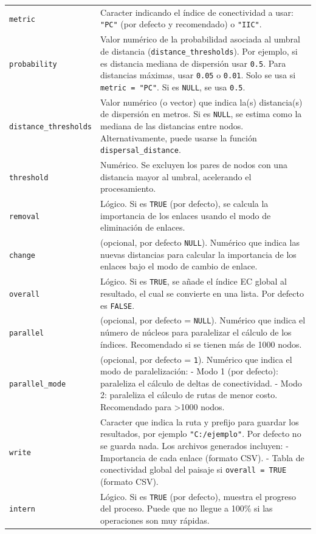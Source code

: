 \documentclass[
]{book}
\begin{document}
\begin{longtable}[]{@{}
  >{\raggedright\arraybackslash}p{}
  >{\raggedright\arraybackslash}p{}@{}}
\texttt{metric} & Caracter indicando el índice de conectividad a usar: \texttt{"PC"} (por defecto y recomendado) o \texttt{"IIC"}. \\
\texttt{probability} & Valor numérico de la probabilidad asociada al umbral de distancia (\texttt{distance\_thresholds}). Por ejemplo, si es distancia mediana de dispersión usar \texttt{0.5}. Para distancias máximas, usar \texttt{0.05} o \texttt{0.01}. Solo se usa si \texttt{metric\ =\ "PC"}. Si es \texttt{NULL}, se usa \texttt{0.5}. \\
\texttt{distance\_thresholds} & Valor numérico (o vector) que indica la(s) distancia(s) de dispersión en metros. Si es \texttt{NULL}, se estima como la mediana de las distancias entre nodos. Alternativamente, puede usarse la función \texttt{dispersal\_distance}. \\
\texttt{threshold} & Numérico. Se excluyen los pares de nodos con una distancia mayor al umbral, acelerando el procesamiento. \\
\texttt{removal} & Lógico. Si es \texttt{TRUE} (por defecto), se calcula la importancia de los enlaces usando el modo de eliminación de enlaces. \\
\texttt{change} & (opcional, por defecto \texttt{NULL}). Numérico que indica las nuevas distancias para calcular la importancia de los enlaces bajo el modo de cambio de enlace. \\
\texttt{overall} & Lógico. Si es \texttt{TRUE}, se añade el índice EC global al resultado, el cual se convierte en una lista. Por defecto es \texttt{FALSE}. \\
\texttt{parallel} & (opcional, por defecto = \texttt{NULL}). Numérico que indica el número de núcleos para paralelizar el cálculo de los índices. Recomendado si se tienen más de 1000 nodos. \\
\texttt{parallel\_mode} & (opcional, por defecto = \texttt{1}). Numérico que indica el modo de paralelización: - Modo 1 (por defecto): paraleliza el cálculo de deltas de conectividad. - Modo 2: paraleliza el cálculo de rutas de menor costo. Recomendado para \textgreater1000 nodos. \\
\texttt{write} & Caracter que indica la ruta y prefijo para guardar los resultados, por ejemplo \texttt{"C:/ejemplo"}. Por defecto no se guarda nada. Los archivos generados incluyen: - Importancia de cada enlace (formato CSV). - Tabla de conectividad global del paisaje si \texttt{overall\ =\ TRUE} (formato CSV). \\
\texttt{intern} & Lógico. Si es \texttt{TRUE} (por defecto), muestra el progreso del proceso. Puede que no llegue a 100\% si las operaciones son muy rápidas. \\
\end{longtable}
\end{document}
